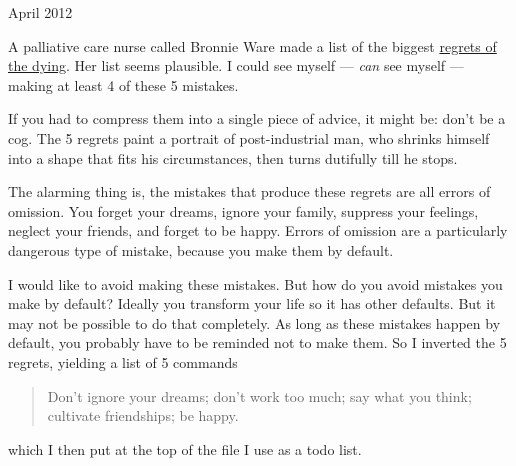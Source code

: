April 2012

A palliative care nurse called Bronnie Ware made a list of the biggest
\href{http://bronnieware.com/regrets-of-the-dying/}{regrets of the
dying}. Her list seems plausible. I could see myself --- \emph{can} see
myself --- making at least 4 of these 5 mistakes.

If you had to compress them into a single piece of advice, it might be:
don't be a cog. The 5 regrets paint a portrait of post-industrial man,
who shrinks himself into a shape that fits his circumstances, then turns
dutifully till he stops.

The alarming thing is, the mistakes that produce these regrets are all
errors of omission. You forget your dreams, ignore your family, suppress
your feelings, neglect your friends, and forget to be happy. Errors of
omission are a particularly dangerous type of mistake, because you make
them by default.

I would like to avoid making these mistakes. But how do you avoid
mistakes you make by default? Ideally you transform your life so it has
other defaults. But it may not be possible to do that completely. As
long as these mistakes happen by default, you probably have to be
reminded not to make them. So I inverted the 5 regrets, yielding a list
of 5 commands

\begin{quote}
Don't ignore your dreams; don't work too much; say what you think;
cultivate friendships; be happy.
\end{quote}

which I then put at the top of the file I use as a todo list.
